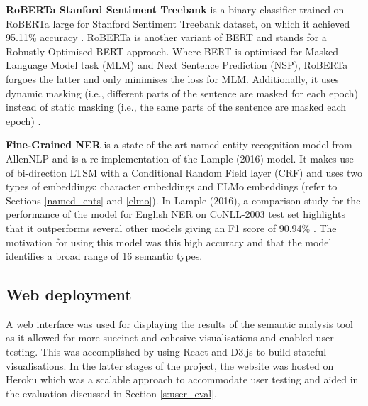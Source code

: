 \textbf{RoBERTa Stanford Sentiment Treebank} is a binary classifier trained on RoBERTa large for Stanford Sentiment Treebank dataset, on which it achieved 95.11\% accuracy \cite{roberta}. RoBERTa is another variant of BERT and stands for a Robustly Optimised BERT approach. Where BERT is optimised for Masked Language Model task (MLM) and Next Sentence Prediction (NSP), RoBERTa forgoes the latter and only minimises the loss for MLM. Additionally, it uses dynamic masking (i.e., different parts of the sentence are masked for each epoch) instead of static masking (i.e., the same parts of the sentence are masked each epoch) \cite{roberta}. 

\textbf{Fine-Grained NER} is a state of the art named entity recognition model from AllenNLP and is a re-implementation of the Lample (2016) \cite{lample} model. It makes use of bi-direction LTSM with a Conditional Random Field layer (CRF) and uses two types of embeddings: character embeddings and ELMo embeddings (refer to Sections \ref{named_ents} and \ref{elmo}). In Lample (2016), a comparison study for the performance of the model for English NER on CoNLL-2003 test set highlights that it outperforms several other models giving an F1 score of 90.94\% \cite{lample}. The motivation for using this model was this high accuracy and that the model identifies a broad range of 16 semantic types.

\subsection{Web deployment}
A web interface was used for displaying the results of the semantic analysis tool as it allowed for more succinct and cohesive visualisations and enabled user testing. This was accomplished by using React and D3.js to build stateful visualisations. In the latter stages of the project, the website was hosted on Heroku \cite{heroku} which was a scalable approach to accommodate user testing and aided in the evaluation discussed in Section \ref{s:user_eval}.